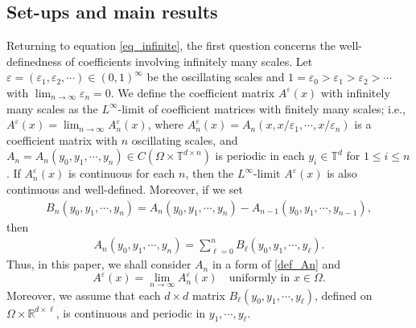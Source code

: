 \documentclass[reqno,12pt]{amsart} %
\theoremstyle{definition}
\theoremstyle{remark}
\numberwithin{equation}{section}
\newcommand{\T}{\mathbb{T}}
\newcommand{\e}{\varepsilon}
\begin{document}
\subsection{Set-ups and main results}
Returning to equation \eqref{eq_infinite}, the first question concerns the well-definedness of coefficients involving infinitely many scales.
 Let $\e = (\e_1,\e_2,\cdots) \in (0,1)^\infty$ be the oscillating scales and $1 = \e_0 > \e_1 > \e_2 > \cdots$ with $\lim_{n\to \infty} \e_n = 0$. We define the coefficient matrix $A^\e(x)$ with infinitely many scales as the $L^\infty$-limit of coefficient matrices with finitely many scales; i.e., $A^\e(x) = \lim_{n\to \infty} A_n^\e(x)$, where $A_n^\e(x) = A_n(x,x/\e_1,\cdots, x/\e_n)$ is a coefficient matrix with $n$ oscillating scales, and $A_n = A_n(y_0, y_1,\cdots, y_n) \in C(\Omega \times \T^{d\times n})$ is periodic in each $y_i\in \T^d$ for $1\le i\le n$. If $A_n^\e(x)$ is continuous for each $n$, then the $L^\infty$-limit $A^\e(x)$ is also continuous and well-defined. 
Moreover, if we set
\begin{align*}
    B_n(y_0,y_1,\cdots, y_n) = A_n(y_0,y_1,\cdots, y_n) - A_{n-1}(y_0,y_1,\cdots, y_{n-1}),
\end{align*}
then
\begin{align}
  \label{def_An}
  A_n(y_0, y_1, \cdots, y_n)=\sum_{\ell=0}^nB_\ell(y_0, y_1, \cdots, y_\ell).
\end{align}
Thus, in this paper, we shall consider $A_n$ in a form of \eqref{def_An} and 
\begin{equation}\label{Linfity_limit}
    A^\e(x) = \lim_{n\to \infty} A_n^\e(x) \quad \text{uniformly in } x\in \Omega.
\end{equation}
Moreover, we assume that each $d\times d$ matrix $B_\ell(y_0, y_1, \cdots, y_\ell)$, 
defined on $\Omega \times \mathbb{R}^{d\times\ell}$,
is continuous and periodic in $y_1, \cdots, y_\ell$. 
\end{document}
